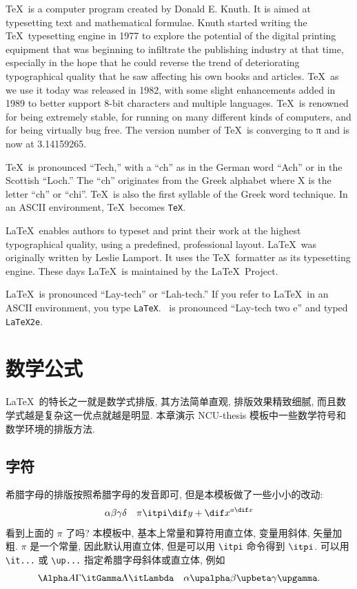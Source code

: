 \documentclass[final]{ncuthesis}
\begin{document}
\begin{abstract*}
\TeX\ is a computer program created by Donald E. Knuth. It is aimed at typesetting text and mathematical formulae. Knuth started writing the \TeX\ typesetting engine in 1977 to explore the potential of the digital printing equipment that was beginning to infiltrate the publishing industry at that time, especially in the hope that he could reverse the trend of deteriorating typographical quality that he saw affecting his own books and articles. \TeX\ as we use it today was released in 1982, with some slight enhancements added in 1989 to better support 8-bit characters and multiple languages. \TeX\ is renowned for being extremely stable, for running on many different kinds of computers, and for being virtually bug free. The version number of \TeX\ is converging to π and is now at 3.14159265.

\TeX\ is pronounced ``Tech,'' with a ``ch'' as in the German word ``Ach'' or
in the Scottish ``Loch.'' The ``ch'' originates from the Greek alphabet where
X is the letter ``ch'' or ``chi''. \TeX\ is also the first syllable of the Greek word technique. In an ASCII environment, \TeX\ becomes \texttt{TeX}.

\LaTeX\ enables authors to typeset and print their work at the highest typographical quality, using a predefined, professional layout. \LaTeX\ was originally written by Leslie Lamport. It uses the \TeX\ formatter as its typesetting engine. These days \LaTeX\ is maintained by the \LaTeX\ Project.

\LaTeX\ is pronounced ``Lay-tech'' or ``Lah-tech.''  If you refer to \LaTeX\ in
an ASCII environment, you type \texttt{LaTeX}. \LaTeXe\ is pronounced ``Lay-tech
two e'' and typed \texttt{LaTeX2e}.
\end{abstract*}
\tableofcontents
\mainmatter
\chapter{数学公式}
\LaTeX\ 的特长之一就是数学式排版, 其方法简单直观, 排版效果精致细腻, 而且数学式越是复杂这一优点就越是明显. \cite{HuWei} 本章演示 NCU-thesis 模板中一些数学符号和数学环境的排版方法. \cite{lshortcn,LiuHaiyang}
\section{字符}
希腊字母的排版按照希腊字母的发音即可, 但是本模板做了一些小小的改动: 
\[
\alpha\beta\gamma\delta \quad \pi\itpi\dif y + \dif x^{a\dif x}
\]
看到上面的 $\pi$ 了吗? 本模板中, 基本上常量和算符用直立体, 变量用斜体, 矢量加粗. $\pi$ 是一个常量, 因此默认用直立体, 但是可以用 \verb|\itpi| 命令得到 $\itpi$. 可以用 \verb|\it...| 或 \verb|\up...| 指定希腊字母斜体或直立体, 例如
\[
\Alpha A \Gamma\itGamma \Lambda\itLambda \quad \alpha\upalpha \beta\upbeta \gamma\upgamma.
\]
\end{document}
